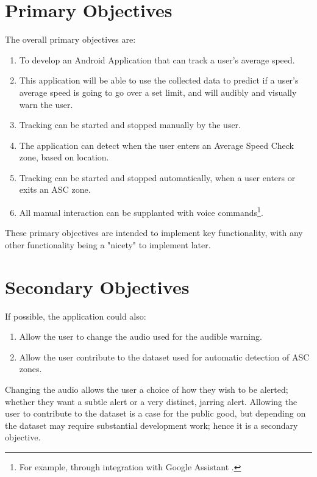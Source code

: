 \documentclass[11pt, a4paper, notitlepage]{report}
\newcounter{objectivesCounter}
\begin{document}
\section{Primary Objectives}\label{sec:PrimObj}
The overall primary objectives are:
\begin{enumerate}
	\item To develop an Android Application that can track a user's average speed.
	\item This application will be able to use the collected data to predict if a user's average speed is going to go over a set limit, and will audibly and visually warn the user.
	\item Tracking can be started and stopped manually by the user.
	\item The application can detect when the user enters an Average Speed Check zone, based on location.
	\item Tracking can be started and stopped automatically, when a user enters or exits an ASC zone.
	\item All manual interaction can be supplanted with voice commands\footnote{For example, through integration with Google Assistant \citep{GoogleAssistant}.}.
	\setcounter{objectivesCounter}{\value{enumi}}
\end{enumerate}
These primary objectives are intended to implement key functionality, with any other functionality being a "nicety" to implement later.

\section{Secondary Objectives}\label{sec:SecObj}
If possible, the application could also:
\begin{enumerate}
	\setcounter{enumi}{\value{objectivesCounter}}
	\item Allow the user to change the audio used for the audible warning.
	\item Allow the user contribute to the dataset used for automatic detection of ASC zones.
	\setcounter{objectivesCounter}{\value{enumi}}
\end{enumerate}
Changing the audio allows the user a choice of how they wish to be alerted; whether they want a subtle alert or a very distinct, jarring alert. Allowing the user to contribute to the dataset is a case for the public good, but depending on the dataset may require substantial development work; hence it is a secondary objective.
\end{document}

